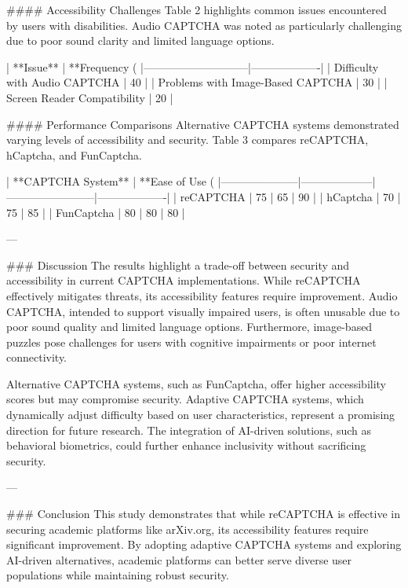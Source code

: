 #### Accessibility Challenges  
Table 2 highlights common issues encountered by users with disabilities. Audio CAPTCHA was noted as particularly challenging due to poor sound clarity and limited language options.

| **Issue**                   | **Frequency (%
|-----------------------------|-------------------|  
| Difficulty with Audio CAPTCHA | 40               |  
| Problems with Image-Based CAPTCHA | 30           |  
| Screen Reader Compatibility | 20               |  

#### Performance Comparisons  
Alternative CAPTCHA systems demonstrated varying levels of accessibility and security. Table 3 compares reCAPTCHA, hCaptcha, and FunCaptcha.

| **CAPTCHA System** | **Ease of Use (%
|---------------------|--------------------|------------------------|-------------------|  
| reCAPTCHA          | 75                | 65                    | 90               |  
| hCaptcha           | 70                | 75                    | 85               |  
| FunCaptcha         | 80                | 80                    | 80               |  

---

### Discussion  
The results highlight a trade-off between security and accessibility in current CAPTCHA implementations. While reCAPTCHA effectively mitigates threats, its accessibility features require improvement. Audio CAPTCHA, intended to support visually impaired users, is often unusable due to poor sound quality and limited language options. Furthermore, image-based puzzles pose challenges for users with cognitive impairments or poor internet connectivity.

Alternative CAPTCHA systems, such as FunCaptcha, offer higher accessibility scores but may compromise security. Adaptive CAPTCHA systems, which dynamically adjust difficulty based on user characteristics, represent a promising direction for future research. The integration of AI-driven solutions, such as behavioral biometrics, could further enhance inclusivity without sacrificing security.

---

### Conclusion  
This study demonstrates that while reCAPTCHA is effective in securing academic platforms like arXiv.org, its accessibility features require significant improvement. By adopting adaptive CAPTCHA systems and exploring AI-driven alternatives, academic platforms can better serve diverse user populations while maintaining robust security.

